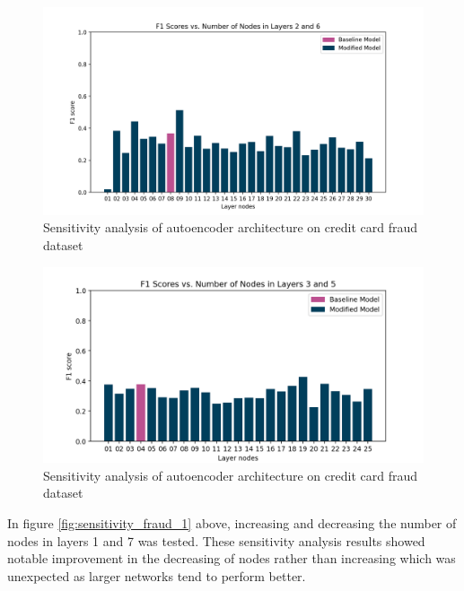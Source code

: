 \documentclass[conference]{IEEEtran}
\begin{document}
\begin{figure}
    \includegraphics[width=\linewidth]{sensitivitiy_baseline_fraud_2.png}
    \caption{Sensitivity analysis of autoencoder architecture on credit card fraud dataset}
    \label{fig:sensitivity_fraud_2}
\end{figure}

\begin{figure}
    \includegraphics[width=\linewidth]{sensitivity_baseline_fraud_3.png}
    \caption{Sensitivity analysis of autoencoder architecture on credit card fraud dataset}
    \label{fig:sensitivity_fraud_3}
\end{figure}


In figure \ref{fig:sensitivity_fraud_1} above, increasing and decreasing the number of nodes in layers 1 and 7 was tested. These sensitivity analysis results showed notable improvement in the decreasing of nodes rather than increasing which was unexpected as larger networks tend to perform better.
\end{document}
